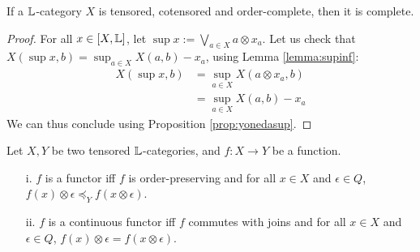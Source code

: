 \begin{proposition}\label{prop:tencoten}
If a $\mathbb{L}$-category $X$ is tensored, cotensored and order-complete, then it is complete.
\end{proposition}
\begin{proof}
For all $x\in [X,\mathbb{L}]$, let $\sup x:= \bigvee_{a\in X}a\otimes x_{a}$. 
Let us check that $X(\sup x, b)= \sup_{a\in X}X(a,b)-x_{a}$, using Lemma \ref{lemma:supinf}:
\begin{align*}
X(\sup x, b) &= \sup_{a\in X}X(a\otimes x_{a},b)\\
&=\sup_{a\in X}X(a,b)-x_{a}
\end{align*}
We can thus conclude using Proposition \ref{prop:yonedasup}.
\end{proof}

\begin{proposition}\label{prop:tenfun}
Let $X,Y$ be two tensored $\mathbb{L}$-categories, and $f:X\to Y$ be a function.
\begin{itemize}
\item[i.] $f$ is a functor iff $f$ is order-preserving and for all $x\in X$ and $\epsilon\in Q$, $f(x)\otimes \epsilon \preceq_{Y} f(x\otimes \epsilon)$.

\item[ii.] $f$ is a continuous functor iff $f$ commutes with joins and for all $x\in X$ and $\epsilon\in Q$, $f(x)\otimes \epsilon = f(x\otimes \epsilon)$.
\end{itemize}
\end{proposition}
